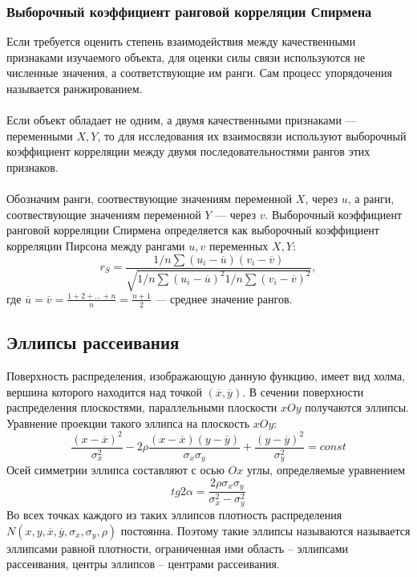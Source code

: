 \subsubsection{Выборочный коэффициент ранговой корреляции Спирмена}
Если требуется оценить степень взаимодействия между качественными признаками изучаемого объекта, для оценки силы связи используются не численные значения, а соответствующие им ранги. Сам процесс упорядочения называется ранжированием.\\ \\
Если объект обладает не одним, а двумя качественными признаками — переменными $X, Y$, то для исследования их взаимосвязи используют выборочный коэффициент корреляции между двумя последовательностями рангов этих признаков. \\ \\
Обозначим ранги, соотвествующие значениям переменной $X$, через $u$, а ранги, соотвествующие значениям переменной $Y$ — через $v$. Выборочный коэффициент ранговой корреляции Спирмена определяется как выборочный коэффициент корреляции Пирсона между рангами $u, v$ переменных $X, Y$:
\begin{equation} \label{eq:r_S}
r_S = \frac{1/n\sum(u_i-\overline{u})(v_i-\overline{v})} 
{\sqrt{1/n\sum (u_i-\overline{u})^2 1/n\sum (v_i-\overline{v})^2}},
\end{equation}
где $\overline{u} = \overline{v} = \frac{1 + 2 + ... + n}{n} = \frac{n+1}{2}$ — среднее значение рангов. \cite{theory}

\subsection{Эллипсы рассеивания}
Поверхность распределения, изображающую данную функцию, имеет вид холма, вершина которого находится над точкой $(\overline{x}, \overline{y})$. В сечении поверхности распределения плоскостями, параллельными плоскости $xOy$ получаются эллипсы. \cite{ellipse_theory} Уравнение проекции такого эллипса на плоскость $xOy$:
\begin{equation} \label{eq:const}
\frac{(x-\overline{x})^2}{\sigma_x^2}
- 2\rho\frac{(x-\overline{x})(y-\overline{y})}{\sigma_x \sigma_y} + \frac{(y-\overline{y})^2}{\sigma_y^2} = const
\end{equation}
Осей симметрии эллипса составляют с осью  $Ox$ углы, определяемые уравнением
\begin{equation} \label{eq:const}
tg 2\alpha = \frac{2\rho\sigma_x\sigma_y}{\sigma_x^2 - \sigma_y^2} 
\end{equation} 
Во всех точках каждого из таких эллипсов плотность распределения $N(x, y, \overline{x}, \overline{y}, \sigma_x, \sigma_y, \rho)$ постоянна. Поэтому такие эллипсы называются называется эллипсами равной плотности, ограниченная ими область – эллипсами рассеивания, центры эллипсов – центрами рассеивания.


